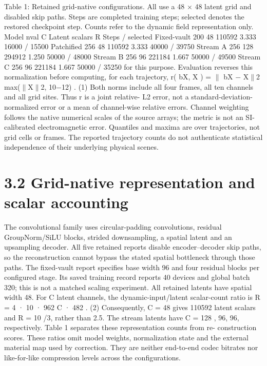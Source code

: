 \documentclass[11pt]{article}
\begin{document}
Table 1: Retained grid-native configurations. All use a 48 \ensuremath{\times} 48 latent grid and disabled skip paths.
Steps are completed training steps; selected denotes the restored checkpoint step. Counts refer to
the dynamic field representation only.
Model nval C Latent scalars R Steps / selected
Fixed-vault 200 48 110592 3.333 16000 / 15500
Patchified 256 48 110592 3.333 40000 / 39750
Stream A 256 128 294912 1.250 50000 / 48000
Stream B 256 96 221184 1.667 50000 / 49500
Stream C 256 96 221184 1.667 50000 / 35250
for this purpose. Evaluation reverses this normalization before computing, for each trajectory,
r( bX, X ) = \ensuremath{\parallel} bX \ensuremath{-} X\ensuremath{\parallel}2
max(\ensuremath{\parallel}X\ensuremath{\parallel}2, 10\ensuremath{-}12) . (1)
Both norms include all four frames, all ten channels and all grid sites. Thus r is a joint relative- L2
error, not a standard-deviation-normalized error or a mean of channel-wise relative errors. Channel
weighting follows the native numerical scales of the source arrays; the metric is not an SI-calibrated
electromagnetic error. Quantiles and maxima are over trajectories, not grid cells or frames. The
reported trajectory counts do not authenticate statistical independence of their underlying physical
scenes.

\section*{3.2 Grid-native representation and scalar accounting}

The convolutional family uses circular-padding convolutions, residual GroupNorm/SiLU blocks,
strided downsampling, a spatial latent and an upsampling decoder. All five retained reports disable
encoder–decoder skip paths, so the reconstruction cannot bypass the stated spatial bottleneck
through those paths. The fixed-vault report specifies base width 96 and four residual blocks per
configured stage. Its saved training record reports 40 devices and global batch 320; this is not a
matched scaling experiment.
All retained latents have spatial width 48. For C latent channels, the dynamic-input/latent
scalar-count ratio is
R = 4 · 10 · 962
C · 482 . (2)
Consequently, C = 48 gives 110592 latent scalars and R = 10 /3, rather than 2.5. The stream
latents have C = 128 , 96, 96, respectively. Table 1 separates these representation counts from re-
construction scores. These ratios omit model weights, normalization state and the external material
map used by correction. They are neither end-to-end codec bitrates nor like-for-like compression
levels across the configurations.
\end{document}
